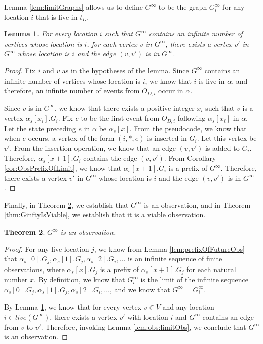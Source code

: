 \documentclass[11pt]{article}
\newtheorem{theorem}{Theorem}
\numberwithin{theorem}{section}
\newtheorem{lemma}[theorem]{Lemma}
\begin{document}
Lemma \ref{lem:limitGraphs} allows us to define $G^\infty$ to be the
graph $G^\infty_i$ for any location $i$ that is live in $t_D$.




\begin{lemma}
\label{lem:GinftyEdges}
For every location $i$ such that $G^\infty$ contains an infinite number of
vertices whose location is $i$, for each vertex $v$ in $G^\infty$, there exists
a vertex $v'$ in $G^\infty$ whose location is $i$ and the edge $(v,v')$ is in
$G^\infty$.
\end{lemma} 

\begin{proof}
Fix $i$ and $v$ as in the hypotheses of the lemma. 
Since $G^\infty$ contains an infinite number of vertices whose location is $i$, we know that $i$ is live in $\alpha$, and therefore, an infinite number of events from $O_{D,i}$ occur in $\alpha$.

Since $v$ is in $G^\infty$, we know that there exists a positive integer $x_i$ such that $v$ is a vertex $\alpha_s[x_i].G_i$. Fix $e$ to be the first event from $O_{D,i}$ following $\alpha_s[x_i]$ in $\alpha$. Let the state preceding $e$ in $\alpha$ be $\alpha_s[x]$. From the pseudocode, we know that when $e$ occurs, a vertex of the form $(i,*,e)$ is inserted in $G_i$. Let this vertex be $v'$. From the insertion operation, we know that an edge $(v,v')$ is added to $G_i$. Therefore, $\alpha_s[x+1].G_i$ contains the edge $(v,v')$. From Corollary \ref{cor:ObsPrefixOfLimit}, we know that $\alpha_s[x+1].G_i$ is a prefix of $G^\infty$. Therefore, there exists
a vertex $v'$ in $G^\infty$ whose location is $i$ and the edge $(v,v')$ is in
$G^\infty$.
\end{proof}





 Finally, in Theorem \ref{thm:GinftyIsObs}, we establish that $G^\infty$ is an observation, and in Theorem \ref{thm:GinftyIsViable}, we establish that it is a viable observation.
 
 \begin{theorem}\label{thm:GinftyIsObs}
 $G^\infty$ is an observation.
 \end{theorem}
 \begin{proof}
 For any live location $j$, we know from Lemma \ref{lem:prefixOfFutureObs} that $\alpha_s[0].G_j,\alpha_s[1].G_j,\alpha_s[2].G_i,\ldots$ is an infinite sequence of finite observations, where $\alpha_s[x].G_j$ is a prefix of $\alpha_s[x+1].G_j$ for each natural number $x$. By definition, 
we know that  $G^\infty_i$ is the limit of the infinite sequence $\alpha_s[0].G_j,\alpha_s[1].G_j,\alpha_s[2].G_i,\ldots$, and we know that $G^\infty = G^\infty_i$.
 
 By Lemma \ref{lem:GinftyEdges}, we know that for every vertex $v \in V$ and any location $i \in live(G^\infty)$,
there exists a vertex $v'$ with location
$i$ and $G^\infty$ contains an edge from $v$ to $v'$.
 Therefore, invoking Lemma \ref{lem:obs:limitObs}, we conclude that $G^\infty$ is an observation.
 \end{proof}
\end{document}
